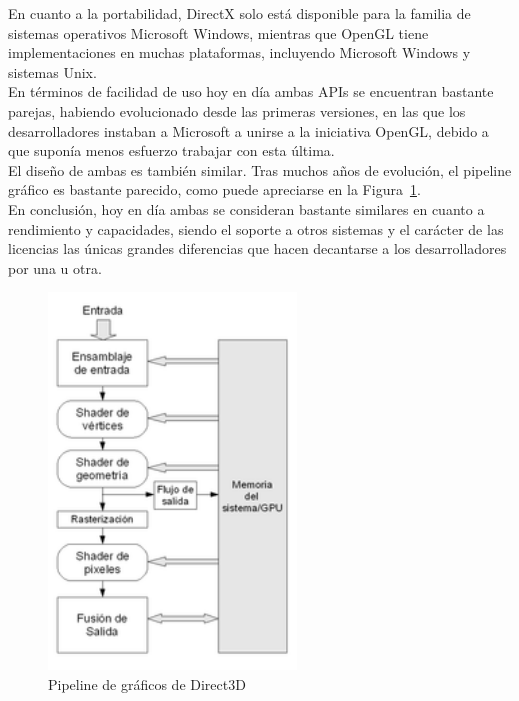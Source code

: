 En cuanto a la portabilidad, DirectX solo está disponible para la familia de
sistemas operativos Microsoft Windows, mientras que OpenGL tiene
implementaciones en muchas plataformas, incluyendo Microsoft Windows y sistemas
Unix.\\

En términos de facilidad de uso hoy en día ambas APIs se encuentran bastante
parejas, habiendo evolucionado desde las primeras versiones, en las que los
desarrolladores instaban a Microsoft a unirse a la iniciativa OpenGL, debido a
que suponía menos esfuerzo trabajar con esta última.\\

El diseño de ambas es también similar. Tras muchos años de evolución, el
pipeline gráfico es bastante parecido, como puede apreciarse en la
Figura~\ref{fig2.3}.\\

En conclusión, hoy en día ambas se consideran bastante similares en cuanto a
rendimiento y capacidades, siendo el soporte a otros sistemas y el carácter de
las licencias las únicas grandes diferencias que hacen decantarse a los
desarrolladores por una u otra.\\

\begin{figure}[h]%
	\centering
	\includegraphics[height=10cm]{figures/directxpipeline.png}
	\caption{Pipeline de gráficos de Direct3D}
	\label{fig2.3}
\end{figure}
